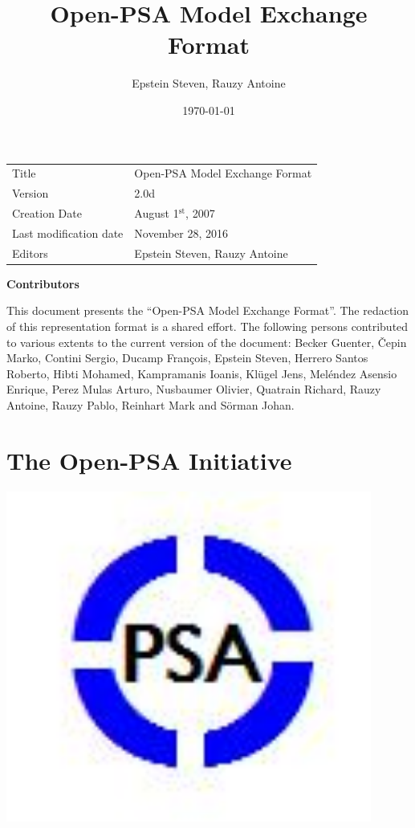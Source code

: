 \documentclass[11pt]{article}
\author{Epstein Steven, Rauzy Antoine}
\date{\today}
\title{Open-PSA Model Exchange Format}
\begin{document}
\maketitle
\tableofcontents

\begin{center}
\begin{tabular}{ll}
Title & Open-PSA Model Exchange Format\\
Version & 2.0d\\
Creation Date & August 1\(^{\text{st}}\), 2007\\
Last modification date & November 28, 2016\\
Editors & Epstein Steven, Rauzy Antoine\\
\end{tabular}
\end{center}


\textbf{Contributors}


This document presents the ``Open-PSA Model Exchange Format''. The
redaction of this representation format is a shared effort. The
following persons contributed to various extents to the current version
of the document: Becker Guenter, Čepin Marko, Contini Sergio, Ducamp
François, Epstein Steven, Herrero Santos Roberto, Hibti Mohamed,
Kampramanis Ioanis, Klügel Jens, Meléndez Asensio Enrique, Perez Mulas
Arturo, Nusbaumer Olivier, Quatrain Richard, Rauzy Antoine, Rauzy Pablo,
Reinhart Mark and Sörman Johan.

\section{The Open-PSA Initiative}
\label{sec:orgc4398d2}



\includegraphics[width=0.9\textwidth]{./word/media/image2.jpeg}
\end{document}
